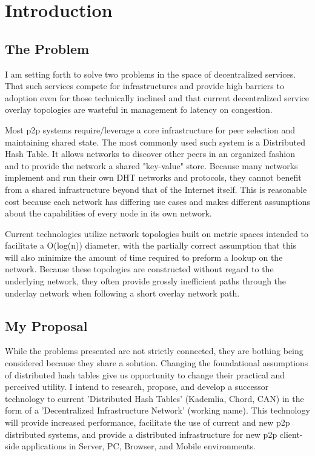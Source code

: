 





\chapter{Introduction}


\section{The Problem}

I am setting forth to solve two problems in the space of decentralized services. That such services compete for infrastructures and provide high barriers to adoption even for those technically inclined and that current decentralized service overlay topologies are wasteful in management fo latency on congestion.

Most p2p systems require/leverage a core infrastructure for peer selection and maintaining shared state.
The most commonly used such system is a Distributed Hash Table\cite{chord}.
It allows networks to discover other peers in an organized fashion and to provide the network a shared "key-value" store.
Because many networks implement and run their own DHT networks and protocols, they cannot benefit from a shared infrastructure beyond that of the Internet itself.
This is reasonable cost because each network has differing use cases and makes different assumptions about the capabilities of every node in its own network.

Current technologies utilize network topologies built on metric spaces intended to facilitate a O(log(n)) diameter, with the partially correct assumption that this will also minimize the amount of time required to preform a lookup on the network. 
Because these topologies are constructed without regard to the underlying network, they often provide grossly inefficient paths through the underlay network when following a short overlay network path.


\section{My Proposal}

While the problems presented are not strictly connected, they are bothing being considered because they share a solution.
Changing the foundational assumptions of distributed hash tables give us opportunity to change their practical and perceived utility.
I intend to research, propose, and develop a successor technology to current 'Distributed Hash Tables' (Kademlia, Chord, CAN) in the form of a 'Decentralized Infrastructure Network' (working name).
This technology will provide increased performance, facilitate the use of current and new p2p distributed systems, and provide a distributed infrastructure for new p2p client-side applications in Server, PC, Browser, and Mobile environments.

